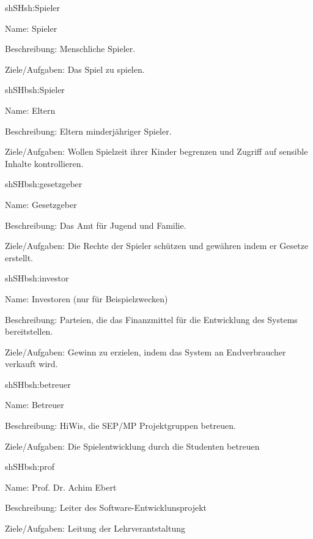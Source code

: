 \begin{description}[leftmargin=5em, style=sameline]
	
	\begin{lhp}{sh}{SH}{sh:Spieler}
		\item [Name:] Spieler
		\item [Beschreibung:] Menschliche Spieler.
		\item [Ziele/Aufgaben:] Das Spiel zu spielen.
	\end{lhp}
	
	\begin{lhp}{sh}{SH}{bsh:Spieler}
		\item [Name:] Eltern
		\item [Beschreibung:] Eltern minderjähriger Spieler.
		\item [Ziele/Aufgaben:] Wollen Spielzeit ihrer Kinder begrenzen und Zugriff auf sensible Inhalte kontrollieren.
	\end{lhp}
	
	\begin{lhp}{sh}{SH}{bsh:gesetzgeber}
		\item [Name:] Gesetzgeber
		\item [Beschreibung:] Das Amt für Jugend und Familie.
		\item [Ziele/Aufgaben:] Die Rechte der Spieler schützen und gewähren indem er Gesetze erstellt. 
	\end{lhp}
	
	\begin{lhp}{sh}{SH}{bsh:investor}
		\item [Name:] Investoren (nur für Beispielzwecken)
		\item [Beschreibung:] Parteien, die das Finanzmittel für die Entwicklung des Systems bereitstellen.
		\item [Ziele/Aufgaben:] Gewinn zu erzielen, indem das System an Endverbraucher verkauft wird.
	\end{lhp}
	
	\begin{lhp}{sh}{SH}{bsh:betreuer}
		\item [Name:] Betreuer
		\item [Beschreibung:] HiWis, die SEP/MP Projektgruppen betreuen.
		\item [Ziele/Aufgaben:] Die Spielentwicklung durch die Studenten betreuen
	\end{lhp}
	
	\begin{lhp}{sh}{SH}{bsh:prof}
		\item [Name:] Prof. Dr. Achim Ebert
		\item [Beschreibung:] Leiter des Software-Entwicklunsprojekt
		\item [Ziele/Aufgaben:]  Leitung der Lehrverantstaltung
	\end{lhp}
		
\end{description}

